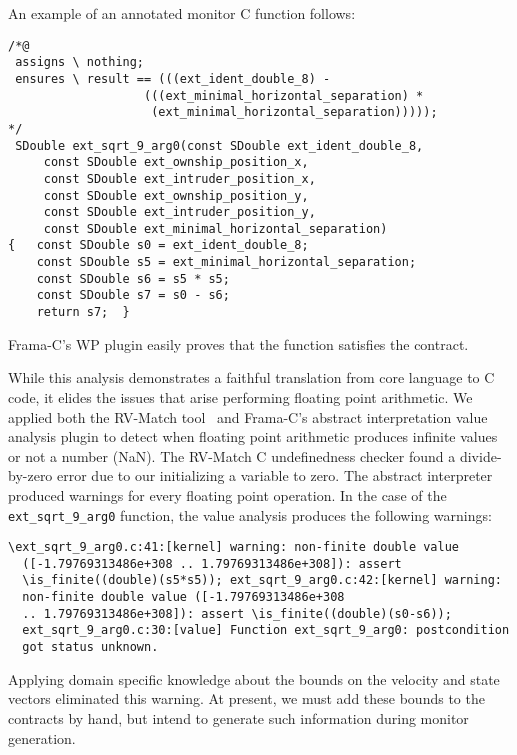 An example of an annotated monitor C function follows: 

\begin{Verbatim}[fontsize=\footnotesize]
/*@
 assigns \ nothing;
 ensures \ result == (((ext_ident_double_8) - 
                   (((ext_minimal_horizontal_separation) *
                    (ext_minimal_horizontal_separation)))));
*/
 SDouble ext_sqrt_9_arg0(const SDouble ext_ident_double_8,
     const SDouble ext_ownship_position_x, 
     const SDouble ext_intruder_position_x, 
     const SDouble ext_ownship_position_y, 
     const SDouble ext_intruder_position_y,
     const SDouble ext_minimal_horizontal_separation)
{   const SDouble s0 = ext_ident_double_8;
    const SDouble s5 = ext_minimal_horizontal_separation;
    const SDouble s6 = s5 * s5;
    const SDouble s7 = s0 - s6;
    return s7;  }
\end{Verbatim}

\noindent
Frama-C's WP plugin easily proves that the function satisfies the
contract. 

While this analysis demonstrates a faithful translation from
core language to C code, it elides the issues that arise performing
floating point arithmetic.  We applied both the RV-Match
tool~\cite{RV-Match} and Frama-C's abstract interpretation value
analysis plugin to detect when floating point arithmetic produces
infinite values or not a number (NaN).  The RV-Match C undefinedness
checker found a divide-by-zero error due to our initializing a
variable to zero.  The abstract interpreter produced warnings for
every floating point operation. In the case of the
\texttt{ext\_sqrt\_9\_arg0} function, the value analysis produces the following
warnings: 
\begin{Verbatim}[fontsize=\footnotesize]
  \ext_sqrt_9_arg0.c:41:[kernel] warning: non-finite double value
  ([-1.79769313486e+308 .. 1.79769313486e+308]): assert
  \is_finite((double)(s5*s5)); ext_sqrt_9_arg0.c:42:[kernel] warning:
  non-finite double value ([-1.79769313486e+308
  .. 1.79769313486e+308]): assert \is_finite((double)(s0-s6));
  ext_sqrt_9_arg0.c:30:[value] Function ext_sqrt_9_arg0: postcondition
  got status unknown.
\end{Verbatim}
Applying domain specific knowledge about  the  bounds on the velocity and state
vectors  eliminated this
warning.  At present, we must add these bounds to the
contracts by hand, but intend to generate  such
information during monitor generation.  

